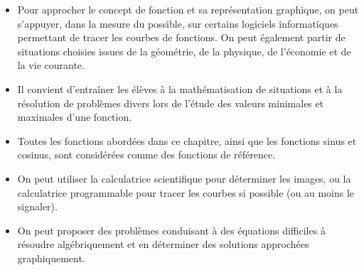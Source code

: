 \vspace{0.2cm}

\begin{tcolorbox}[fichebox, title={Les orientations pédagogiques}]
\begin{itemize}
    \item Pour approcher le concept de fonction et sa représentation graphique, on peut s'appuyer, dans la mesure du possible, sur certains logiciels informatiques permettant de tracer les courbes de fonctions. On peut également partir de situations choisies issues de la géométrie, de la physique, de l'économie et de la vie courante.
    \item Il convient d'entraîner les élèves à la mathématisation de situations et à la résolution de problèmes divers lors de l'étude des valeurs minimales et maximales d'une fonction.
    \item Toutes les fonctions abordées dans ce chapitre, ainsi que les fonctions sinus et cosinus, sont considérées comme des fonctions de référence.
    \item On peut utiliser la calculatrice scientifique pour déterminer les images, ou la calculatrice programmable pour tracer les courbes si possible (ou au moins le signaler).
    \item On peut proposer des problèmes conduisant à des équations difficiles à résoudre algébriquement et en déterminer des solutions approchées graphiquement.
\end{itemize}
\end{tcolorbox}

